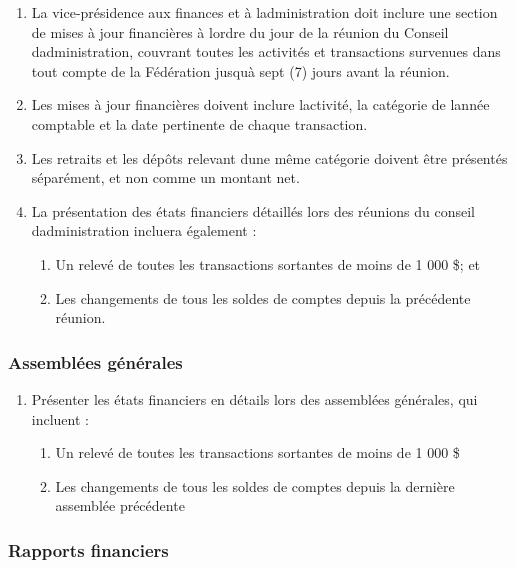\begin{enumerate}
 \item
  La vice-présidence aux finances et à l\textquotesingle administration doit inclure une section de mises à jour financières à l\textquotesingle ordre du jour de la réunion du Conseil d\textquotesingle administration, couvrant toutes les activités et transactions survenues dans tout compte de la Fédération jusqu\textquotesingle à sept (7) jours avant la réunion.
 \item
  Les mises à jour financières doivent inclure l\textquotesingle activité, la catégorie de l\textquotesingle année comptable et la date pertinente de chaque transaction.
 \item
  Les retraits et les dépôts relevant d\textquotesingle une même catégorie doivent être présentés séparément, et non comme un montant net.
 \item
  La présentation des états financiers détaillés lors des réunions du conseil d\textquotesingle administration incluera également :

  \begin{enumerate}
   \item
    Un relevé de toutes les transactions sortantes de moins de 1 000 \$; et
   \item
    Les changements de tous les soldes de comptes depuis la précédente réunion.
  \end{enumerate}
\end{enumerate}

\subsubsection{Assemblées générales}
\label{assemblees-generales-financiers}

\begin{enumerate}
 \item
  Présenter les états financiers en détails lors des assemblées générales, qui incluent :

  \begin{enumerate}
   \item
    Un relevé de toutes les transactions sortantes de moins de 1 000 \$
   \item
    Les changements de tous les soldes de comptes depuis la dernière assemblée précédente
  \end{enumerate}
\end{enumerate}

\subsubsection{Rapports financiers}
\label{rapports-financiers}

